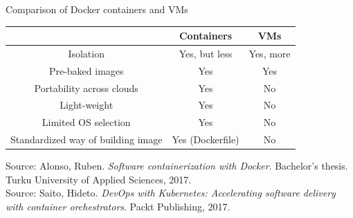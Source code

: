\documentclass{beamer}
\begin{document}
\begin{frame}{Comparison of Docker containers and VMs}%
\begin{center}
	\begin{flushleft}
	\begin{tabular}{@{}  | c | c | c | @{}}
		\hline
		 & \textbf{Containers} & \textbf{VMs} \\
		 \hline
		 Isolation & Yes, but less & Yes, more \\
		 \hline
		 Pre-baked images & Yes & Yes \\
		 \hline
		Portability across clouds & Yes & No \\
		\hline
		Light-weight & Yes & No \\
		\hline
		Limited OS selection & Yes & No \\
		\hline
		Standardized way of building image & Yes (Dockerfile) & No \\
		\hline
		\end{tabular}
	\end{flushleft}
\end{center}
\tiny{Source: Alonso, Ruben. \textit{Software containerization with Docker}. Bachelor's thesis. Turku University of Applied Sciences, 2017.} \\
\tiny{Source: Saito, Hideto. \textit{DevOps with Kubernetes: Accelerating software delivery with container orchestrators}. Packt Publishing, 2017.}
\end{frame}
\end{document}
